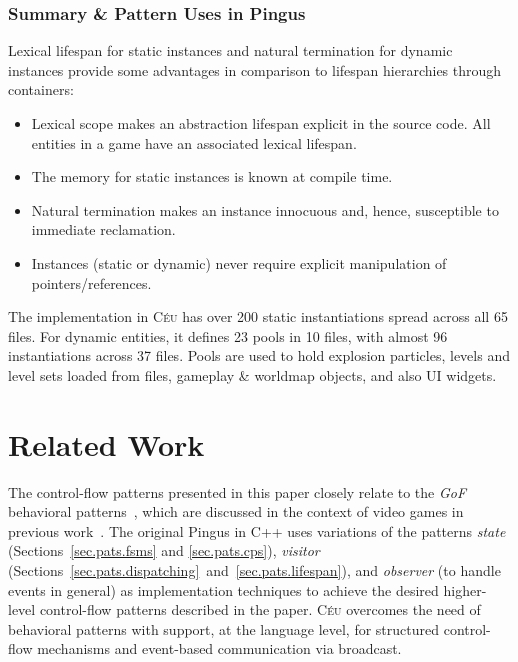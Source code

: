 \documentclass[10pt, conference, compsocconf]{IEEEtran}
\newcommand{\CEU}{\textsc{C\'{e}u}\xspace}
\newcommand{\code}[1] {{\small{\texttt{#1}}}}
\begin{document}
\subsubsection{Summary \& Pattern Uses in Pingus}

Lexical lifespan for static instances and natural termination for dynamic
instances provide some advantages in comparison to lifespan hierarchies through
containers:

\begin{itemize}
\item Lexical scope makes an abstraction lifespan explicit in the source code.
      All entities in a game have an associated lexical lifespan.
\item The memory for static instances is known at compile time.
\item Natural termination makes an instance innocuous and, hence, susceptible
      to immediate reclamation.
\item Instances (static or dynamic) never require explicit manipulation of
      pointers/references.
\end{itemize}

The implementation in \CEU has over 200 static instantiations spread across all
65 files.
For dynamic entities, it defines 23 pools in 10 files, with almost 96
instantiations across 37 files.
Pools are used to hold explosion particles, levels and level sets loaded from
files, gameplay \& worldmap objects, and also UI widgets.

\section{Related Work}
\label{sec.related}

The control-flow patterns presented in this paper closely relate to the
\emph{GoF} behavioral patterns~\cite{gof}, which are discussed in the context
of video games in previous
work~\cite{games.patterns,games.gof.2015,games.gof.2007}.
%
The original Pingus in C++ uses variations of the patterns
    \emph{state} (Sections~\ref{sec.pats.fsms} and \ref{sec.pats.cps}),
    \emph{visitor} (Sections~\ref{sec.pats.dispatching}~and~\ref{sec.pats.lifespan}), and
    \emph{observer} (to handle events in general)
as implementation techniques to achieve the desired higher-level
control-flow patterns described in the paper.
%
\CEU overcomes the need of behavioral patterns with support, at the language
level, for structured control-flow mechanisms and event-based communication via
broadcast.
%
\end{document}
